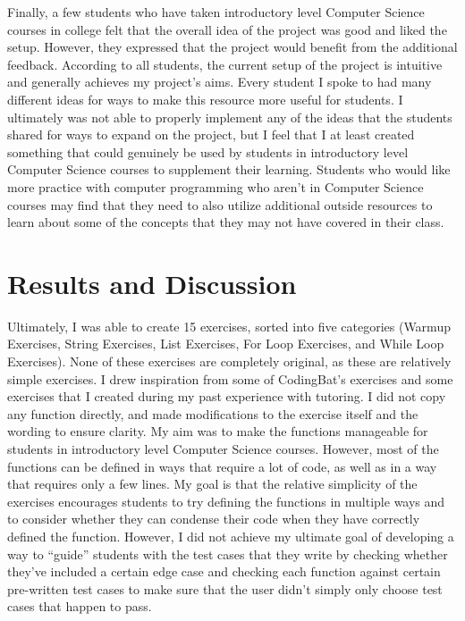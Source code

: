 \documentclass[10pt,twocolumn]{article}
\begin{document}
Finally, a few students who have taken introductory level Computer Science courses in college felt that the overall idea of the project was good and liked the setup. However, they expressed that the project would benefit from the additional feedback. According to all students, the current setup of the project is intuitive and generally achieves my project's aims. Every student I spoke to had many different ideas for ways to make this resource more useful for students. I ultimately was not able to properly implement any of the ideas that the students shared for ways to expand on the project, but I feel that I at least created something that could genuinely be used by students in introductory level Computer Science courses to supplement their learning. Students who would like more practice with computer programming who aren't in Computer Science courses may find that they need to also utilize additional outside resources to learn about some of the concepts that they may not have covered in their class.

\section{Results and Discussion}

Ultimately, I was able to create 15 exercises, sorted into five categories (Warmup Exercises, String Exercises, List Exercises, For Loop Exercises, and While Loop Exercises). None of these exercises are completely original, as these are relatively simple exercises. I drew inspiration from some of CodingBat's exercises \cite{CodingBat} and some exercises that I created during my past experience with tutoring. I did not copy any function directly, and made modifications to the exercise itself and the wording to ensure clarity. My aim was to make the functions manageable for students in introductory level Computer Science courses. However, most of the functions can be defined in ways that require a lot of code, as well as in a way that requires only a few lines. My goal is that the relative simplicity of the exercises encourages students to try defining the functions in multiple ways and to consider whether they can condense their code when they have correctly defined the function. However, I did not achieve my ultimate goal of developing a way to \enquote{guide} students with the test cases that they write by checking whether they've included a certain edge case and checking each function against certain pre-written test cases to make sure that the user didn't simply only choose test cases that happen to pass.
\end{document}
